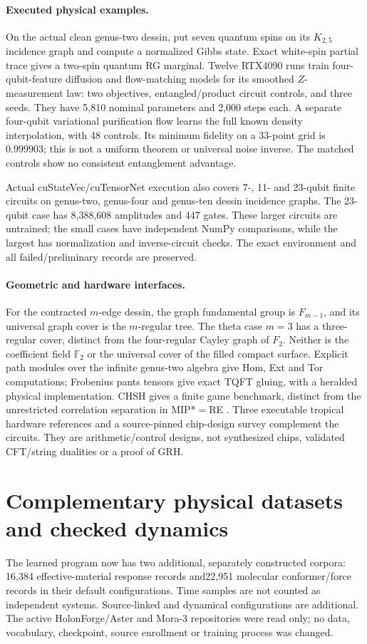 \documentclass[11pt]{article}
\theoremstyle{definition}\newtheorem{definition}[theorem]{Definition}
\theoremstyle{remark}\newtheorem{remark}[theorem]{Remark}
\begin{document}
\paragraph{Executed physical examples.}
On the actual clean genus-two dessin, put seven quantum spins on its
$K_{2,5}$ incidence graph and compute a normalized Gibbs state. Exact white-spin
partial trace gives a two-spin quantum RG marginal. Twelve RTX4090 runs train
four-qubit-feature diffusion and flow-matching models for its smoothed
$Z$-measurement law: two objectives, entangled/product circuit controls, and
three seeds. They have 5,810 nominal parameters and 2,000 steps each.
A separate four-qubit variational purification flow learns the full known
density interpolation, with 48 controls. Its minimum fidelity on a 33-point
grid is $0.999903$; this is not a uniform theorem or universal noise inverse.
The matched controls show no consistent entanglement advantage.

Actual cuStateVec/cuTensorNet execution also covers 7-, 11- and 23-qubit
finite circuits on genus-two, genus-four and genus-ten dessin incidence
graphs. The 23-qubit case has 8,388,608 amplitudes and 447 gates. These larger
circuits are untrained; the small cases have independent NumPy comparisons,
while the largest has normalization and inverse-circuit checks.
The exact environment and all failed/preliminary records are preserved.

\paragraph{Geometric and hardware interfaces.}
For the contracted $m$-edge dessin, the graph fundamental group is
$F_{m-1}$, and its universal graph cover is the $m$-regular tree.
The theta case $m=3$ has a three-regular cover, distinct from the four-regular
Cayley graph of $F_2$. Neither is the coefficient field $\mathbb F_2$ or the
universal cover of the filled compact surface. Explicit path modules over the
infinite genus-two algebra give Hom, Ext and Tor computations; Frobenius
pants tensors give exact TQFT gluing, with a heralded physical implementation.
CHSH gives a finite game benchmark, distinct from the unrestricted
correlation separation in MIP*$=$RE \cite{LFMIP}. Three executable tropical
hardware references and a source-pinned chip-design survey complement the
circuits. They are arithmetic/control designs, not synthesized chips,
validated CFT/string dualities or a proof of GRH.

\section{Complementary physical datasets and checked dynamics}
The learned program now has two additional, separately constructed corpora:
16,384 effective-material response records and22,951 molecular conformer/force
records in their default configurations. Time samples are not counted as
independent systems. Source-linked and dynamical configurations are additional.
The active HolonForge/Aster and Mora-3 repositories were read only; no data,
vocabulary, checkpoint, source enrollment or training process was changed.
\end{document}

